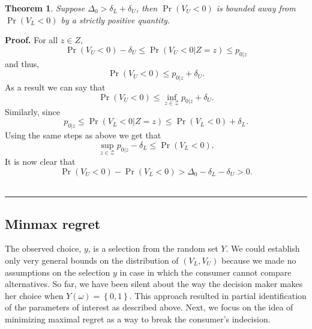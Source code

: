 \documentclass[reqno]{article}
\newtheorem{theorem}{Theorem}
\newenvironment{proof}[1][Proof]{\textbf{#1.} }{\ \rule{0.5em}{0.5em}}
\begin{document}
\begin{theorem}
Suppose $\Delta _{0}>\delta _{L}+\delta _{U}$, then $\Pr \left(
V_{U}<0\right) $ is bounded away from $\Pr \left( V_{L}<0\right) $ by a
strictly positive quantity.
\end{theorem}

\begin{proof}
For all $z\in Z$, 
\begin{equation*}
\Pr (V_{U}<0)-\delta _{U}\leq \Pr \left( V_{U}<0|Z=z\right) \leq p_{0|z}
\end{equation*}%
and thus,%
\begin{equation*}
\Pr (V_{U}<0)\leq p_{0|z}+\delta _{U}.
\end{equation*}%
As a result we can say that%
\begin{equation*}
\Pr \left( V_{U}<0\right) \leq \inf_{z\in \mathcal{Z}}p_{0|z}+\delta _{U}.
\end{equation*}%
Similarly, since 
\begin{equation*}
p_{0|z}\leq \Pr \left( V_{L}<0|Z=z\right) \leq \Pr (V_{L}<0)+\delta _{L}.
\end{equation*}%
Using the same steps as above we get that%
\begin{equation*}
\sup_{z\in \mathcal{Z}}p_{0|z}-\delta _{L}\leq \Pr \left( V_{L}<0\right) .
\end{equation*}%
It is now clear that 
\begin{equation*}
\Pr (V_{U}<0)-\Pr \left( V_{L}<0\right) >\Delta _{0}-\delta _{L}-\delta
_{U}>0.
\end{equation*}
\end{proof}

\subsection{Minmax regret}

The observed choice, $y$, is a selection from the random set $Y$. We could
establish only very general bounds on the distribution of $\left(
V_{L},V_{U}\right) $ because we made no assumptions on the selection $y$ in
case in which the consumer cannot compare alternatives. So far, we have been
silent about the way the decision maker makes her choice when $Y\left(
\omega \right) =\left\{ 0,1\right\} $. This approach resulted in partial
identification of the parameters of interest as described above. Next, we
focus on the idea of minimizing maximal regret as a way to break the
consumer's indecision.
\end{document}
